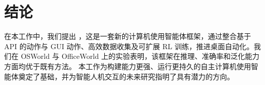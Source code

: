 \section{结论}
在本工作中，我们提出 \computerrl，这是一套新的计算机使用智能体框架，通过整合基于 API 的动作与 GUI 动作、高效数据收集及可扩展 RL 训练，推进桌面自动化。我们在 OSWorld 与 OfficeWorld 上的实验表明，该框架在推理、准确率和泛化能力方面均优于既有方法。
本工作为构建能力更强、运行更持久的自主计算机使用智能体奠定了基础，并为智能人机交互的未来研究指明了具有潜力的方向。
